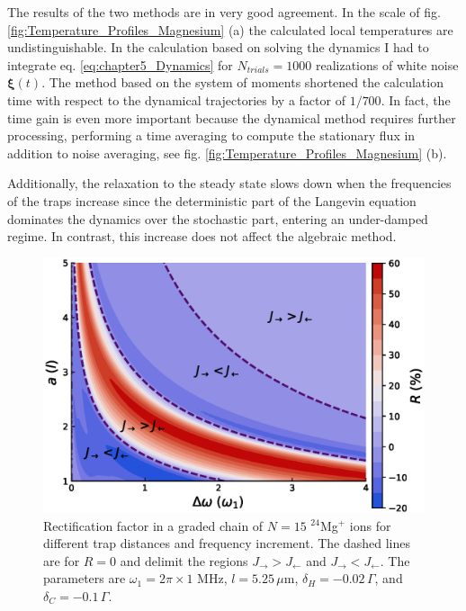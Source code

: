 The results of the two methods are in very good agreement. In the scale of fig. \ref{fig:Temperature_Profiles_Magnesium} (a)
the calculated local temperatures are undistinguishable. In the calculation based on solving the dynamics I had to integrate eq. \eqref{eq:chapter5_Dynamics} for $N_{trials} = 1000$ realizations of white noise $\bm{\xi}(t)$. The method based on the system of moments
shortened the calculation time with respect to the dynamical trajectories   by a factor of $1/700$. In fact, the time gain is even more important because
the dynamical method requires further processing, performing a time averaging to compute the stationary flux in addition to noise averaging, see fig.  \ref{fig:Temperature_Profiles_Magnesium} (b).


Additionally, the relaxation to the steady state slows down when the frequencies of the traps increase since the deterministic part of the Langevin equation dominates the dynamics over the stochastic part, entering an under-damped regime. In contrast, this increase does not affect the
algebraic method.
\begin{figure}
  \center
  \includegraphics[width=0.85\linewidth]{Figures/Graded_24Mg_Rectification_VS_Gradient_and_lattConstant.eps}
  \caption{ Rectification factor in a graded chain of $N=15$ $^{24}$Mg$^+$ ions for different trap distances and frequency increment. The dashed lines are for $R = 0$ and delimit the regions $J_\rightarrow > J_\leftarrow$ and $J_\rightarrow < J_\leftarrow$. The parameters  are $\omega_1 = 2 \pi \times 1$ MHz, $l = 5.25\,\mu$m, $\delta_H = -0.02 \,\Gamma$, and $\delta_C = -0.1 \, \Gamma$.}
  \label{fig:Graded_24Mg_Rectification_VS_Gradient_and_lattConstant}
\end{figure}
%
%
%
%
